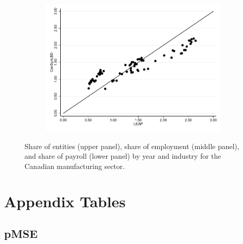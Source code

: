 \documentclass[10pt,twoside]{article}
\begin{document}
\begin{figure}[H]
\begin{subfigure}[h]{0.5\linewidth}
\includegraphics[trim=0 0 0 -20,clip,width=\linewidth]{graphs/Share_of_payroll_by_NAICS_two-digit_and_year_Manufacturing_bw.pdf}
\end{subfigure}
\caption{Share of entities (upper panel), share of employment (middle panel), and share of payroll (lower panel) by year and industry for the Canadian manufacturing sector.}\label{fig:FirmShare_manufac}
\end{figure}




































\section{Appendix Tables}
\label{sec:appendix_tables}






\subsection{pMSE}
\label{sec:pmse_tables}
\end{document}
